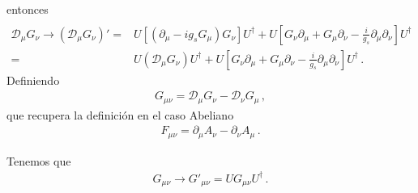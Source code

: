entonces
\begin{align}
    \nonumber\\
\mathcal{D}_{\mu} G_{\nu}\to   \left(   \mathcal{D}_{\mu} G_{\nu} \right)' =& U \left[ \left( \partial_{\mu}-ig_s G_{\mu} \right)G_\nu   \right]U^{\dagger}
    + U \left[ G_{\nu} \partial_{\mu}+G_{\mu}\partial_{\nu}-\frac{i}{g_s} \partial_{\mu}\partial_{\nu} \right] U^{\dagger} \nonumber\\
 =& U \left( \mathcal{D}_{\mu}G_\nu   \right)U^{\dagger}
    + U \left[ G_{\nu} \partial_{\mu}+G_{\mu}\partial_{\nu}-\frac{i}{g_s} \partial_{\mu}\partial_{\nu} \right] U^{\dagger} \,.%
\end{align} 
Definiendo
\begin{align}
  G_{\mu\nu}=\mathcal{D}_{\mu}G_{\nu}-\mathcal{D}_{\nu}G_{\mu}\,,
\end{align}
que recupera la definición en el caso Abeliano
\begin{align}
  F_{\mu\nu}=\partial_{\mu} A_{\nu}-\partial_{\nu}A_{\mu}\,.
\end{align}

Tenemos que
\begin{align}
  G_{\mu\nu}\to G'_{\mu\nu}=U G_{\mu\nu} U^{\dagger}\,.
\end{align}


